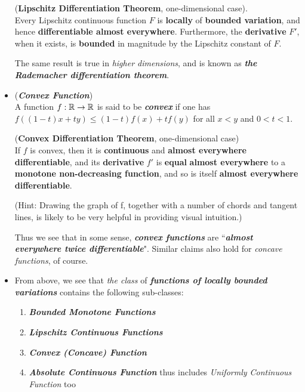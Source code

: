 \documentclass[11pt]{article}
\begin{document}
\begin{itemize}
\begin{corollary}  (\textbf{Lipschitz Differentiation Theorem}, one-dimensional case). \\
Every Lipschitz continuous function $F$ is \textbf{locally} of \textbf{bounded variation}, and hence \textbf{differentiable almost everywhere}. Furthermore,  the \textbf{derivative} $F'$, when it exists, is \textbf{bounded} in magnitude by the Lipschitz constant of $F$.
\end{corollary}

\begin{remark}
The same result is true in \emph{higher dimensions}, and is known as \emph{\textbf{the Rademacher differentiation theorem}}.
\end{remark}

\item \begin{definition} (\emph{\textbf{Convex Function}})\\
A function $f : {\mathbb R} \rightarrow {\mathbb R}$  is said to be \emph{\textbf{convex}} if one has $f((1- t)x + ty) \le (1- t)f(x) + tf(y)$ for all $x < y$ and $0 < t < 1$.
\end{definition}

\begin{corollary} (\textbf{Convex Differentiation Theorem}, one-dimensional case)\\
If $f$ is convex, then it is \textbf{continuous} and \textbf{almost everywhere differentiable}, and its \textbf{derivative} $f'$ is \textbf{equal} \textbf{almost everywhere} to a \textbf{monotone non-decreasing function}, and so is itself \textbf{almost everywhere differentiable}. 
\end{corollary} (Hint: Drawing the graph of f, together with a number of chords and tangent lines, is likely to be very helpful in providing
visual intuition.) 

\begin{remark}
Thus we see that in some sense, \emph{\textbf{convex functions}} are ``\emph{\textbf{almost everywhere twice differentiable}}". Similar claims also hold
for \emph{concave functions}, of course.
\end{remark}

\item \begin{remark}
From above, we see that \emph{the class} of \emph{\textbf{functions of locally bounded variations}} contains the following sub-classes:
\begin{enumerate}
\item \emph{\textbf{Bounded Monotone Functions}}
\item \emph{\textbf{Lipschitz Continuous Functions}}
\item \emph{\textbf{Convex (Concave) Function}}
\item \emph{\textbf{Absolute Continuous Function}} thus includes \emph{Uniformly Continuous Function} too
\end{enumerate}
\end{remark}
\end{itemize}
\end{document}
